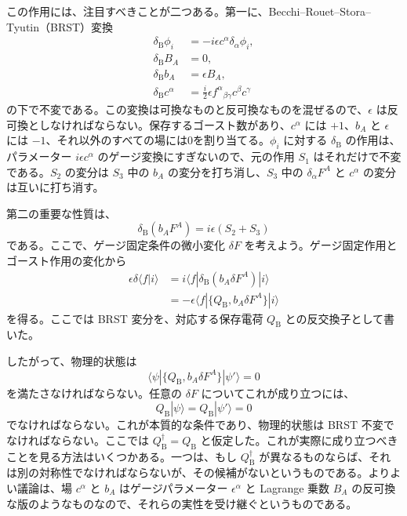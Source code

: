 この作用には、注目すべきことが二つある。第一に、Becchi--Rouet--Stora--Tyutin（BRST）変換
\begin{align}
\delta_{\mathrm B}\phi_i&=-i\epsilon c^\alpha\delta_\alpha\phi_i,
\tag{4.2.6a}\label{eq:4.2.6a}\\
\delta_{\mathrm B}B_A&=0,
\tag{4.2.6b}\label{eq:4.2.6b}\\
\delta_{\mathrm B}b_A&=\epsilon B_A,
\tag{4.2.6c}\label{eq:4.2.6c}\\
\delta_{\mathrm B}c^\alpha&=\frac i2\epsilon f^\alpha{}_{\beta\gamma}c^\beta c^\gamma
\tag{4.2.6d}\label{eq:4.2.6d}
\end{align}
の下で不変である。この変換は可換なものと反可換なものを混ぜるので、$\epsilon$ は反可換としなければならない。保存するゴースト数があり、$c^\alpha$ には $+1$、$b_A$ と $\epsilon$ には $-1$、それ以外のすべての場には0を割り当てる。$\phi_i$ に対する $\delta_{\mathrm B}$ の作用は、パラメーター $i\epsilon c^\alpha$ のゲージ変換にすぎないので、元の作用 $S_1$ はそれだけで不変である。$S_2$ の変分は $S_3$ 中の $b_A$ の変分を打ち消し、$S_3$ 中の $\delta_\alpha F^A$ と $c^\alpha$ の変分は互いに打ち消す。

第二の重要な性質は、
\begin{equation}
\delta_{\mathrm B}(b_AF^A)=i\epsilon(S_2+S_3)
\tag{4.2.7}\label{eq:4.2.7}
\end{equation}
である。ここで、ゲージ固定条件の微小変化 $\delta F$ を考えよう。ゲージ固定作用とゴースト作用の変化から
\begin{equation}
\begin{aligned}
\epsilon\delta\langle f|i\rangle
&=i\langle f|\delta_{\mathrm B}(b_A\delta F^A)|i\rangle\\
&=-\epsilon\langle f|\{Q_{\mathrm B},b_A\delta F^A\}|i\rangle
\end{aligned}
\tag{4.2.8}\label{eq:4.2.8}
\end{equation}
を得る。ここでは BRST 変分を、対応する保存電荷 $Q_{\mathrm B}$ との反交換子として書いた。

したがって、物理的状態は
\begin{equation}
\langle\psi|\{Q_{\mathrm B},b_A\delta F^A\}|\psi'\rangle=0
\tag{4.2.9}\label{eq:4.2.9}
\end{equation}
を満たさなければならない。任意の $\delta F$ についてこれが成り立つには、
\begin{equation}
Q_{\mathrm B}|\psi\rangle=Q_{\mathrm B}|\psi'\rangle=0
\tag{4.2.10}\label{eq:4.2.10}
\end{equation}
でなければならない。これが本質的な条件であり、物理的状態は BRST 不変でなければならない。ここでは $Q_{\mathrm B}^\dagger=Q_{\mathrm B}$ と仮定した。これが実際に成り立つべきことを見る方法はいくつかある。一つは、もし $Q_{\mathrm B}^\dagger$ が異なるものならば、それは別の対称性でなければならないが、その候補がないというものである。よりよい議論は、場 $c^\alpha$ と $b_A$ はゲージパラメーター $\epsilon^\alpha$ と Lagrange 乗数 $B_A$ の反可換な版のようなものなので、それらの実性を受け継ぐというものである。

